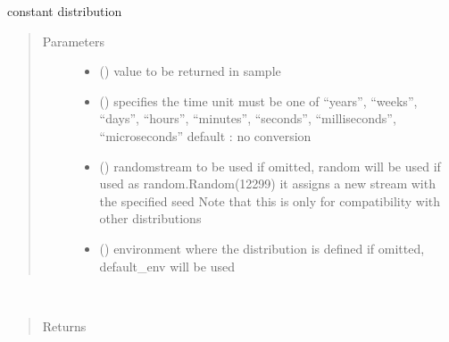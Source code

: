 \documentclass[letterpaper,10pt,english]{sphinxmanual}
\begin{document}

\begin{fulllineitems}
\label{\detokenize{Reference:salabim.Constant}}
constant distribution
\begin{quote}\begin{description}
\item[{Parameters}] \leavevmode\begin{itemize}
\item {} 
 () \textendash{} value to be returned in sample

\item {} 
 () \textendash{} specifies the time unit 
must be one of “years”, “weeks”, “days”, “hours”, “minutes”, “seconds”, “milliseconds”, “microseconds” 
default : no conversion 

\item {} 
 () \textendash{} randomstream to be used 
if omitted, random will be used 
if used as random.Random(12299)
it assigns a new stream with the specified seed 
Note that this is only for compatibility with other distributions

\item {} 
 ({\hyperref[\detokenize{Reference:salabim.Environment}]{}}) \textendash{} environment where the distribution is defined 
if omitted, default\_env will be used

\end{itemize}

\end{description}\end{quote}

\begin{fulllineitems}
\label{\detokenize{Reference:salabim.Constant.mean}}~\begin{quote}\begin{description}
\item[{Returns}] \leavevmode
{}


\end{description}
\end{quote}
\end{fulllineitems}
\end{fulllineitems}
\end{document}
